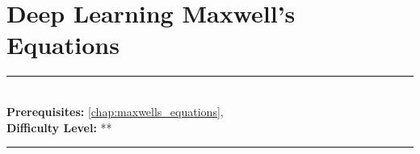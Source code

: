 \documentclass[book.tex]{subfiles}
\begin{document}
\chapter{Deep Learning Maxwell's Equations}

\label{chap:deep_maxwells}
\noindent\rule{11cm}{0.4pt} \\
\textbf{Prerequisites:} \autoref{chap:maxwells_equations},   \\
\textbf{Difficulty Level:} ** \\
\noindent\rule{11cm}{0.4pt}
\vspace{5mm}
\end{document}
